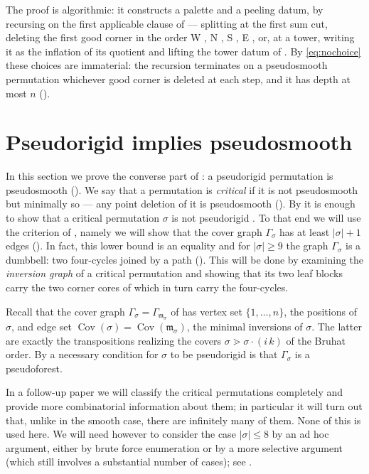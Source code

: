 \documentclass[12pt]{article}
\def\xspace{ }%
\theoremstyle{definition}
\newcommand{\prig}{pseudorigid\xspace}
\newcommand{\Prig}{Pseudorigid\xspace}
\newcommand{\psm}{pseudosmooth\xspace}
\newcommand{\good}{good\xspace}
\newcommand{\pal}{palette\xspace}      %
\newcommand{\mm}{\mathfrak{m}}
\newcommand{\Cov}{\operatorname{Cov}}  %
\newcommand{\Wcr}{W\xspace}    %
\newcommand{\Ncr}{N\xspace}    %
\newcommand{\Scr}{S\xspace}    %
\newcommand{\Ecr}{E\xspace}    %
\newcommand{\cores}{corner cores\xspace}
\newcommand{\cgr}{\Gamma}                 %
\begin{document}
The proof is algorithmic: it constructs a \pal and a peeling
datum, by recursing on the first applicable clause of  ---
splitting at the first sum cut, deleting the first \good corner in the
order \Wcr, \Ncr, \Scr, \Ecr,
or, at a tower, writing it as the inflation of its quotient and lifting the tower datum of . By \eqref{eq:nochoice} these choices are
immaterial: the recursion terminates on a \psm permutation whichever
\good corner is deleted at each step, and it has depth at most $n$ ().

\section{\Prig implies \psm}\label{sec:converse}

In this section we prove the converse part of : a \prig permutation is \psm
().
We say that a permutation is \emph{critical} if it is not \psm but minimally so ---
any point deletion of it is \psm ().
By  it is enough to show that a critical permutation $\sigma$ is not \prig.
To that end we will use the criterion of , namely we will show that
the cover graph $\cgr_\sigma$ has at least
$|\sigma|+1$ edges (). In fact, this lower bound is an
equality and for $|\sigma|\ge9$ the graph $\cgr_\sigma$ is a dumbbell:
two four-cycles joined by a path (). This will be done by examining the \emph{inversion graph} of a critical permutation and showing that its two leaf blocks
carry the two \cores of  which in turn carry the four-cycles.

Recall that the cover graph $\cgr_\sigma = \cgr_{\mm_\sigma}$ of
 has vertex set $\{1,\dots,n\}$, the positions of
$\sigma$, and edge set $\Cov(\sigma)=\Cov(\mm_\sigma)$, the minimal inversions of $\sigma$.
The latter are exactly the transpositions realizing the covers
$\sigma \gtrdot \sigma\cdot(i\,k)$ of the Bruhat order.
By  a necessary condition for $\sigma$ to be \prig is that $\cgr_\sigma$ is a pseudoforest.

In a follow-up paper we will classify the critical permutations completely and provide more combinatorial information about them;
in particular it will turn out that, unlike in the smooth case, there are infinitely many of them.
None of this is used here.
We will need however to consider the case $|\sigma|\le8$ by an ad hoc argument, either
by brute force enumeration or by a more selective argument (which still involves a substantial number of cases);
see .
\end{document}
